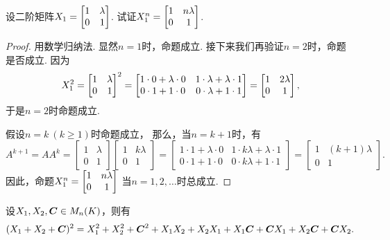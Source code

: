 \begin{example}
设二阶矩阵\(X_1=\begin{bmatrix} 1 & \lambda \\ 0 & 1 \end{bmatrix}\).
试证\(X_1^n=\begin{bmatrix} 1 & n\lambda \\ 0 & 1 \end{bmatrix}\).
\begin{proof}
用数学归纳法.
显然\(n=1\)时，命题成立.
接下来我们再验证\(n=2\)时，命题是否成立.
因为\[
	X_1^2
	= \begin{bmatrix}
		1 & \lambda \\
		0 & 1
	\end{bmatrix}^2
	= \begin{bmatrix}
		1\cdot0+\lambda\cdot0 & 1\cdot\lambda+\lambda\cdot1 \\
		0\cdot1+1\cdot0 & 0\cdot\lambda+1\cdot1
	\end{bmatrix}
	= \begin{bmatrix}
		1 & 2\lambda \\
		0 & 1
	\end{bmatrix},
\]
于是\(n=2\)时命题成立.

假设\(n=k\ (k\geq1)\)时命题成立，
那么，当\(n=k+1\)时，有\[
	A^{k+1}
	= A A^k
	= \begin{bmatrix}
		1 & \lambda \\
		0 & 1
	\end{bmatrix}
	\begin{bmatrix}
		1 & k\lambda \\
		0 & 1
	\end{bmatrix}
	= \begin{bmatrix}
		1\cdot1+\lambda\cdot0 & 1\cdot k\lambda+\lambda\cdot1 \\
		0\cdot1+1\cdot0 & 0\cdot k\lambda+1\cdot1
	\end{bmatrix}
	= \begin{bmatrix}
		1 & (k+1)\lambda \\
		0 & 1
	\end{bmatrix}.
\]
因此，命题\(X_1^n=\begin{bmatrix} 1 & n\lambda \\ 0 & 1 \end{bmatrix}\)
当\(n=1,2,\dotsc\)时总成立.
\end{proof}
\end{example}

\begin{example}
设\(X_1,X_2,\boldsymbol{C} \in M_n(K)\)，则有\[
	(X_1 + X_2 + \boldsymbol{C})^2
	= X_1^2 + X_2^2 + \boldsymbol{C}^2 + X_1X_2 + X_2X_1 + X_1\boldsymbol{C} + \boldsymbol{C}X_1 + X_2\boldsymbol{C} + \boldsymbol{C}X_2.
\]
\end{example}

